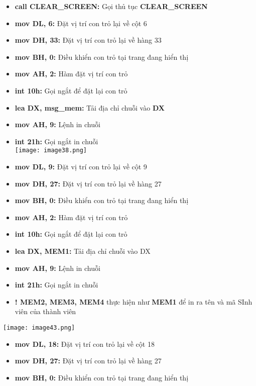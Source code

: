 \begin{itemize}
\begin{itemize}
        \item \textbf{call CLEAR\_SCREEN:} Gọi thủ tục \textbf{CLEAR\_SCREEN }
        \item \textbf{mov DL, 6:} Đặt vị trí con trỏ lại về cột 6 
        \item \textbf{mov DH, 33:} Đặt vị trí con trỏ lại về hàng 33
        \item \textbf{mov BH, 0:} Điều khiển con trỏ tại trang đang hiển thị 
        \item \textbf{mov AH, 2:} Hàm đặt vị trí con trỏ
        \item \textbf{int 10h:} Gọi ngắt để đặt lại con trỏ
        \item \textbf{lea DX, msg\_mem:} Tải địa chỉ chuỗi vào \textbf{DX}
        \item \textbf{mov AH, 9:} Lệnh in chuỗi
        \item \textbf{int 21h:} Gọi ngắt in chuỗi \\
        \texttt{[image: image38.png]}
        \item \textbf{mov DL, 9:} Đặt vị trí con trỏ lại về cột 9 
        \item \textbf{mov DH, 27:} Đặt vị trí con trỏ lại về hàng 27
        \item \textbf{mov BH, 0:} Điều khiển con trỏ tại trang đang hiển thị 
        \item \textbf{mov AH, 2:} Hàm đặt vị trí con trỏ
        \item \textbf{int 10h:} Gọi ngắt để đặt lại con trỏ
        \item \textbf{lea DX, MEM1:} Tải địa chỉ chuỗi vào DX 
        \item \textbf{mov AH, 9:} Lệnh in chuỗi
        \item \textbf{int 21h:} Gọi ngắt in chuỗi
        \item[] \textbf{{\large !} MEM2, MEM3, MEM4} thực hiện như  \textbf{MEM1} để in ra tên và mã SInh viên của thành viên 
    \end{itemize}  
    \texttt{[image: image43.png]}
    \begin{itemize}
            \item \textbf{mov DL, 18:} Đặt vị trí con trỏ lại về cột 18
            \item \textbf{mov DH, 27:} Đặt vị trí con trỏ lại về hàng 27
            \item \textbf{mov BH, 0:} Điều khiển con trỏ tại trang đang hiển thị 

\end{itemize}
\end{itemize}
